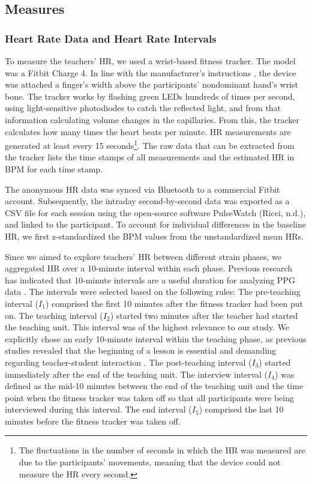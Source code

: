 \documentclass[]{elsarticle} %
\begin{document}
\hypertarget{measures}{%
\subsection{Measures}\label{measures}}

\hypertarget{heart-rate-data-and-heart-rate-intervals}{%
\subsubsection{Heart Rate Data and Heart Rate
Intervals}\label{heart-rate-data-and-heart-rate-intervals}}

To measure the teachers' HR, we used a wrist-based fitness tracker. The
model was a Fitbit Charge 4. In line with the manufacturer's
instructions \citep{fitbitnd}, the device was attached a finger's width
above the participants' nondominant hand's wrist bone. The tracker works
by flashing green LEDs hundreds of times per second, using
light-sensitive photodiodes to catch the reflected light, and from that
information calculating volume changes in the capillaries. From this,
the tracker calculates how many times the heart beats per minute. HR
measurements are generated at least every 15 seconds\footnote{The
  fluctuations in the number of seconds in which the HR was measured are
  due to the participants' movements, meaning that the device could not
  measure the HR every second.}. The raw data that can be extracted from
the tracker lists the time stamps of all measurements and the estimated
HR in BPM for each time stamp.

The anonymous HR data was synced via Bluetooth to a commercial Fitbit
account. Subsequently, the intraday second-by-second data was exported
as a CSV file for each session using the open-source software PulseWatch
(Ricci, n.d.), and linked to the participant. To account for individual
differences in the baseline HR, we first z-standardized the BPM values
from the unstandardized mean HRs.

Since we aimed to explore teachers' HR between different strain phases,
we aggregated HR over a 10-minute interval within each phase. Previous
research has indicated that 10-minute intervals are a useful duration
for analyzing PPG data \citep{lu2008can}. The intervals were selected
based on the following rules: The pre-teaching interval (\(I_1\))
comprised the first 10 minutes after the fitness tracker had been put
on. The teaching interval (\(I_2\)) started two minutes after the
teacher had started the teaching unit. This interval was of the highest
relevance to our study. We explicitly chose an early 10-minute interval
within the teaching phase, as previous studies revealed that the
beginning of a lesson is essential and demanding regarding
teacher-student interaction
\citep{donker2018quantitative, claessens2017positive}. The post-teaching
interval (\(I_3\)) started immediately after the end of the teaching
unit. The interview interval (\(I_4\)) was defined as the mid-10 minutes
between the end of the teaching unit and the time point when the fitness
tracker was taken off so that all participants were being interviewed
during this interval. The end interval (\(I_5\)) comprised the last 10
minutes before the fitness tracker was taken off.
\end{document}
